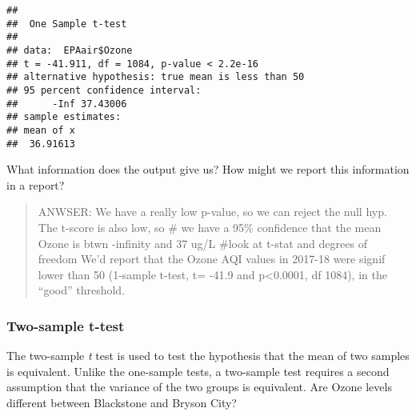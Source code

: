 \documentclass[]{article}
\newenvironment{Shaded}{\begin{snugshade}}{\end{snugshade}}
\newcommand{\KeywordTok}[1]{\textcolor[rgb]{0.13,0.29,0.53}{\textbf{#1}}}
\newcommand{\DataTypeTok}[1]{\textcolor[rgb]{0.13,0.29,0.53}{#1}}
\newcommand{\DecValTok}[1]{\textcolor[rgb]{0.00,0.00,0.81}{#1}}
\newcommand{\StringTok}[1]{\textcolor[rgb]{0.31,0.60,0.02}{#1}}
\newcommand{\CommentTok}[1]{\textcolor[rgb]{0.56,0.35,0.01}{\textit{#1}}}
\newcommand{\OperatorTok}[1]{\textcolor[rgb]{0.81,0.36,0.00}{\textbf{#1}}}
\newcommand{\NormalTok}[1]{#1}
\begin{document}
\begin{Shaded}
\end{Shaded}

\begin{verbatim}
## 
##  One Sample t-test
## 
## data:  EPAair$Ozone
## t = -41.911, df = 1084, p-value < 2.2e-16
## alternative hypothesis: true mean is less than 50
## 95 percent confidence interval:
##      -Inf 37.43006
## sample estimates:
## mean of x 
##  36.91613
\end{verbatim}

What information does the output give us? How might we report this
information in a report?

\begin{quote}
ANWSER: We have a really low p-value, so we can reject the null hyp. The
t-score is also low, so \# we have a 95\% confidence that the mean Ozone
is btwn -infinity and 37 ug/L \#look at t-stat and degrees of freedom
We'd report that the Ozone AQI values in 2017-18 were signif lower than
50 (1-sample t-test, t= -41.9 and p\textless{}0.0001, df 1084), in the
``good'' threshold.
\end{quote}

\subsubsection{Two-sample t-test}\label{two-sample-t-test}

The two-sample \emph{t} test is used to test the hypothesis that the
mean of two samples is equivalent. Unlike the one-sample tests, a
two-sample test requires a second assumption that the variance of the
two groups is equivalent. Are Ozone levels different between Blackstone
and Bryson City?

\begin{Shaded}
\end{Shaded}
\end{document}
